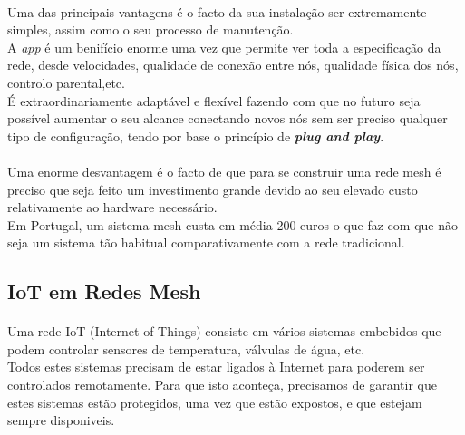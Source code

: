 \documentclass[letterpaper, 11pt]{article}
\begin{document}
\paragraph{}
Uma das principais vantagens é o facto da sua instalação ser extremamente simples, assim como o seu processo de manutenção.\\
A \emph{app} é um benifício enorme uma vez que permite ver toda a especificação da rede, desde velocidades, qualidade de conexão entre nós, qualidade física dos nós, controlo parental,etc.\\
É extraordinariamente adaptável e flexível fazendo com que no futuro seja possível aumentar o seu alcance conectando novos nós sem ser preciso qualquer tipo de configuração, tendo por base
o princípio de \textbf{\emph{plug and play}}.

\paragraph{}
Uma enorme desvantagem é o facto de que para se construir uma rede mesh é preciso que seja feito um investimento grande devido ao seu elevado custo relativamente ao hardware necessário.\\
Em Portugal, um sistema mesh custa em média 200 euros o que faz com que não seja um sistema tão habitual comparativamente com a rede tradicional.

\subsection{IoT em Redes Mesh}
\label{sec:org94026b9}

\paragraph{}
Uma rede IoT (Internet of Things) consiste em vários sistemas embebidos que podem controlar sensores de temperatura, válvulas de água, etc.\\
Todos estes sistemas precisam de estar ligados à Internet para poderem ser controlados remotamente. Para que isto aconteça, precisamos de garantir que estes sistemas estão protegidos, uma
vez que estão expostos, e que estejam sempre disponiveis.\\
\end{document}
